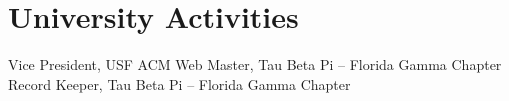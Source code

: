 \section{University Activities}
		{Vice President, USF ACM}{}{}{}{}
		{Web Master, Tau Beta Pi -- Florida Gamma Chapter}{}{}{}{}
		{Record Keeper, Tau Beta Pi -- Florida Gamma Chapter}{}{}{}{}
